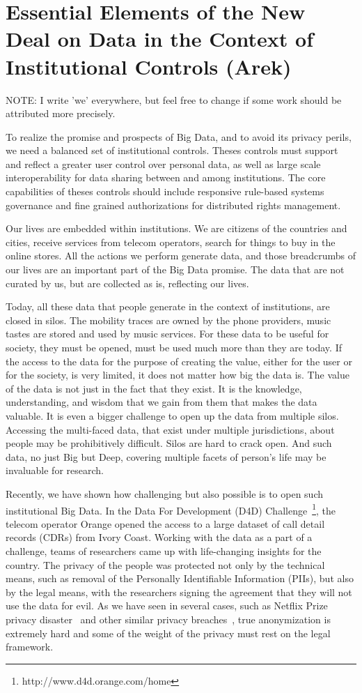 \section{Essential Elements of the New Deal on Data in the Context of Institutional Controls (Arek)}

NOTE: I write 'we' everywhere, but feel free to change if some work should be attributed more precisely.

To realize the promise and prospects of Big Data, and to avoid its privacy perils, we need a balanced set of institutional controls.
Theses controls must support and reflect a greater user control over personal data, as well as large scale interoperability for data sharing between and among institutions.
The core capabilities of theses controls should include responsive rule-based systems governance and fine grained authorizations for distributed rights management.

Our lives are embedded within institutions. 
We are citizens of the countries and cities, receive services from telecom operators, search for things to buy in the online stores. 
All the actions we perform generate data, and those breadcrumbs of our lives are an important part of the Big Data promise.
The data that are not curated by us, but are collected as is, reflecting our lives.

Today, all these data that people generate in the context of institutions, are closed in silos. 
The mobility traces are owned by the phone providers, music tastes are stored and used by music services.
For these data to be useful for society, they must be opened, must be used much more than they are today.
If the access to the data for the purpose of creating the value, either for the user or for the society, is very limited, it does not matter how big the data is. 
The value of the data is not just in the fact that they exist.
It is the knowledge, understanding, and wisdom that we gain from them that makes the data valuable.  
It is even a bigger challenge to open up the data from multiple silos.
Accessing the multi-faced data, that exist under multiple jurisdictions, about people may be prohibitively difficult.
Silos are hard to crack open.
And such data, no just Big but Deep, covering multiple facets of person's life may be invaluable for research.

Recently, we have shown how challenging but also possible is to open such institutional Big Data.
In the Data For Development (D4D) Challenge~\footnote{http://www.d4d.orange.com/home}, the telecom operator Orange opened the access to a large dataset of call detail records (CDRs) from Ivory Coast.
Working with the data as a part of a challenge, teams of researchers came up with life-changing insights for the country. 
The privacy of the people was protected not only by the technical means, such as removal of the Personally Identifiable Information (PIIs), but also by the legal means, with the researchers signing the agreement that they will not use the data for evil.
As we have seen in several cases, such as Netflix Prize privacy disaster~\cite{narayanan2008robust} and other similar privacy breaches~\cite{sweeney2000simple}, true anonymization is extremely hard and some of the weight of the privacy must rest on the legal framework.

